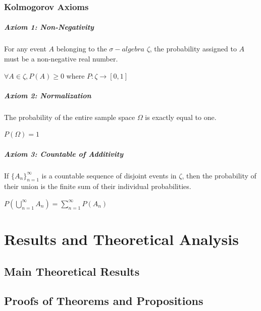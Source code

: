 \documentclass[11pt]{report}
\begin{document}
\subsection{Kolmogorov Axioms}

\paragraph{Axiom 1: Non-Negativity}
For any event $A$ belonging to the  $\sigma-algebra \,\,\zeta$, the probability assigned to $A$ must be a non-negative real number. 

\begin{center}
    $\forall A \in\zeta,  P(A) \ge 0$ where $P:\zeta \rightarrow [0,1]$
\end{center}

\paragraph{Axiom 2: Normalization} The probability of the entire sample space $\Omega$ is exactly equal to one.

\begin{center}
    $P(\Omega) = 1$
\end{center}

\paragraph{Axiom 3: Countable of Additivity}

If $\displaystyle {\{A_n}\}_{n=1}^\infty$ is a countable sequence of disjoint events in $\zeta$, then the probability of their union is the finite sum of their individual probabilities.

\begin{center}
    $\displaystyle P\left(\bigcup_{n=1}^{\infty}A_n\right) =\sum_{n=1}^\infty P\left(A_n\right)$
\end{center}




\chapter{Results and Theoretical Analysis}

\section{Main Theoretical Results}


\section{Proofs of Theorems and Propositions}
\end{document}
